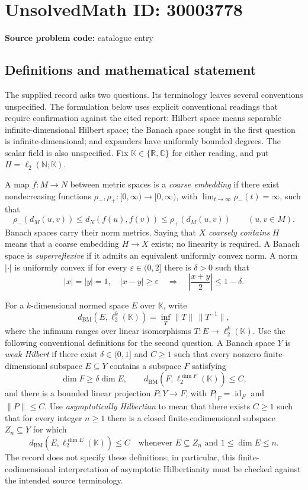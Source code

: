\documentclass[11pt]{article}
\newcommand{\N}{\mathbb{N}}
\newcommand{\R}{\mathbb{R}}
\newcommand{\C}{\mathbb{C}}
\begin{document}
\section*{UnsolvedMath ID: 30003778}
\textbf{Source problem code:} catalogue entry
\subsection{Definitions and mathematical statement}
The supplied record asks two questions. Its terminology leaves several conventions unspecified. The formulation below uses explicit conventional readings that require confirmation against the cited report: Hilbert space means separable infinite-dimensional Hilbert space; the Banach space sought in the first question is infinite-dimensional; and expanders have uniformly bounded degrees. The scalar field is also unspecified. Fix \(\mathbb K\in\{\R,\C\}\) for either reading, and put \(H=\ell_2(\N;\mathbb K)\).

A map \(f:M\to N\) between metric spaces is a \emph{coarse embedding} if there exist nondecreasing functions \(\rho_-,\rho_+:[0,\infty)\to[0,\infty)\), with \(\lim_{t\to\infty}\rho_-(t)=\infty\), such that
\[
 \rho_-(d_M(u,v))\le d_N(f(u),f(v))\le\rho_+(d_M(u,v))
 \qquad(u,v\in M).
\]
Banach spaces carry their norm metrics. Saying that \(X\) \emph{coarsely contains} \(H\) means that a coarse embedding \(H\to X\) exists; no linearity is required. A Banach space is \emph{superreflexive} if it admits an equivalent uniformly convex norm. A norm \(|\cdot|\) is uniformly convex if for every \(\varepsilon\in(0,2]\) there is \(\delta>0\) such that
\[
 |x|=|y|=1,\quad |x-y|\ge\varepsilon
 \quad\Longrightarrow\quad
 \left|\frac{x+y}{2}\right|\le 1-\delta.
\]

For a \(k\)-dimensional normed space \(E\) over \(\mathbb K\), write
\[
 d_{\mathrm{BM}}(E,\ell_2^k(\mathbb K))
 =\inf_T\|T\|\,\|T^{-1}\|,
\]
where the infimum ranges over linear isomorphisms \(T:E\to\ell_2^k(\mathbb K)\). Use the following conventional definitions for the second question. A Banach space \(Y\) is \emph{weak Hilbert} if there exist \(\delta\in(0,1]\) and \(C\ge1\) such that every nonzero finite-dimensional subspace \(E\subseteq Y\) contains a subspace \(F\) satisfying
\[
 \dim F\ge\delta\dim E,\qquad
 d_{\mathrm{BM}}(F,\ell_2^{\dim F}(\mathbb K))\le C,
\]
and there is a bounded linear projection \(P:Y\to F\), with \(P|_F=\operatorname{id}_F\) and \(\|P\|\le C\). Use \emph{asymptotically Hilbertian} to mean that there exists \(C\ge1\) such that for every integer \(n\ge1\) there is a closed finite-codimensional subspace \(Z_n\subseteq Y\) for which
\[
 d_{\mathrm{BM}}(E,\ell_2^{\dim E}(\mathbb K))\le C
 \quad\text{whenever }E\subseteq Z_n\text{ and }1\le\dim E\le n.
\]
The record does not specify these definitions; in particular, this finite-codimensional interpretation of asymptotic Hilbertianity must be checked against the intended source terminology.
\end{document}
